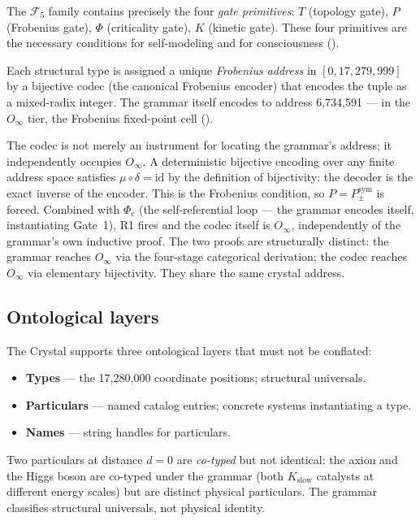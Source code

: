 \documentclass[12pt,a4paper]{article}
\newcommand{\Phic}{\Phi_c}
\newcommand{\Ppms}{P_{\pm}^{\text{sym}}}
\newcommand{\Oinf}{O_\infty}
\begin{document}
\noindent
The $\mathcal{F}_5$ family contains precisely the four \emph{gate
primitives}: $T$ (topology gate), $P$ (Frobenius gate), $\Phi$
(criticality gate), $K$ (kinetic gate). These four primitives are the
necessary conditions for self-modeling and for consciousness
().

Each structural type is assigned a unique \emph{Frobenius address} in
$[0, 17{,}279{,}999]$ by a bijective codec (the canonical Frobenius
encoder) that encodes the tuple as a mixed-radix integer. The grammar
itself encodes to address 6,734,591 --- in the $\Oinf$ tier,
the Frobenius fixed-point cell ().

The codec is not merely an instrument for locating the grammar's
address; it independently occupies $\Oinf$. A deterministic bijective
encoding over any finite address space satisfies $\mu \circ \delta =
\mathrm{id}$ by the definition of bijectivity: the decoder is the
exact inverse of the encoder. This is the Frobenius condition, so
$P = \Ppms$ is forced. Combined with $\Phic$ (the self-referential
loop --- the grammar encodes itself, instantiating Gate~1), R1 fires
and the codec itself is $\Oinf$, independently of the grammar's own
inductive proof. The two proofs are structurally distinct: the grammar
reaches $\Oinf$ via the four-stage categorical derivation; the codec
reaches $\Oinf$ via elementary bijectivity. They share the same
crystal address.

\subsection{Ontological layers}

The Crystal supports three ontological layers that must not be
conflated:
\begin{itemize}[noitemsep]
  \item \textbf{Types} --- the 17,280,000 coordinate positions;
    structural universals.
  \item \textbf{Particulars} --- named catalog entries; concrete systems
    instantiating a type.
  \item \textbf{Names} --- string handles for particulars.
\end{itemize}
Two particulars at distance $d = 0$ are \emph{co-typed} but not
identical: the axion and the Higgs boson are co-typed under the grammar
(both $K_\text{slow}$ catalysts at different energy scales) but are
distinct physical particulars. The grammar classifies structural universals,
not physical identity.
\end{document}
